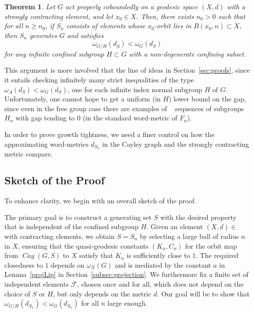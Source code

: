 \documentclass{amsart}
\newtheorem{mainthm}{Theorem}
\renewcommand*{\themainthm}{\Alph{mainthm}}
\numberwithin{thm}{section}
\numberwithin{figure}{section}
\newenvironment{restatethm}[1]
  {
   \renewcommand{\themainthm}{\getrefnumber{#1}}%
   \refstepcounter{mainthm}%
   \addtocounter{mainthm}{-1}%
   \phantomsection%
   \begin{mainthm}
  }
  {\end{mainthm}}
\theoremstyle{definition}
\theoremstyle{definition}
\theoremstyle{remark}
\numberwithin{equation}{section}
\DeclareMathOperator{\Cay}{\mathit{Cay}}
\DeclareMathOperator{\DDG}{\mathcal{D}(G)}
\theoremstyle{plain}
\begin{document}
\begin{restatethm}{GrowthTight4SomeS}
Let $G$ act properly coboundedly on a geodesic space $(X,d)$ with a strongly contracting element, and let $x_0 \in X$. Then, there exists $n_0 > 0$ such that for all $n \geq n_0$, if $S_n$ consists of elements whose $x_0$-orbit lies in $B(x_0,n) \subset X$, then $S_n$ generates $G$ and satisfies 
\[
\omega_{G/H}(d_{\bar{S}}) < \omega_G(d_S)
\]
for any infinite confined subgroup $H \subset G$ with a non-degenerate confining subset.
\end{restatethm}

This argument is more involved that the line of ideas in Section~\ref{sec:proofs}, since it entails checking infinitely many strict inequalities of the type $\omega_A(d_{S}) < \omega_G(d_{S})$, one for each infinite index normal subgroup $H$ of $G$. Unfortunately, one cannot hope to get a uniform  (in $H$) lower bound on the gap, since even in the free group case there are examples of ~\cite[Corollary~1.4]{JM20:FreeGap} sequences of subgroups $H_n$ with gap tending to $0$ (in the standard word-metric of $F_n$).

In order to prove growth tightness, we need a finer control on how the approximating word-metrics $d_{S_n}$ in the Cayley graph and the strongly contracting metric compare.

\subsection{Sketch of the Proof}
\label{subsec:sketch}
To enhance clarity, we begin with an overall sketch of the proof.

 The primary goal is to construct a generating set $S$ with the desired property that is independent of the confined subgroup $H$. Given an element $(X, d) \in \DDG$ with contracting elements, we obtain $S=S_n$ by selecting a large ball of radius $n$ in $X$, ensuring that the quasi-geodesic constants $(K_n, C_n)$ for the orbit map from $\Cay(G, S)$ to $X$ satisfy that $K_n$ is sufficiently close to $1$. The required closedness to $1$ depends on $\omega_X(G)$ and is mediated by the constant $a$ in Lemma~\ref{projLip} in Section~\ref{subsec:projection}. 
We furthermore fix a finite set of independent elements $\mathcal{F}$, chosen once and for all, which does not depend on the choice of $S$ or $H$, but only depends on the metric $d$.  Our goal will be to show that $\omega_{G/H}(d_{S_n}) < \omega_{G}(d_{S_n})$ for all $n$ large enough.
\end{document}
